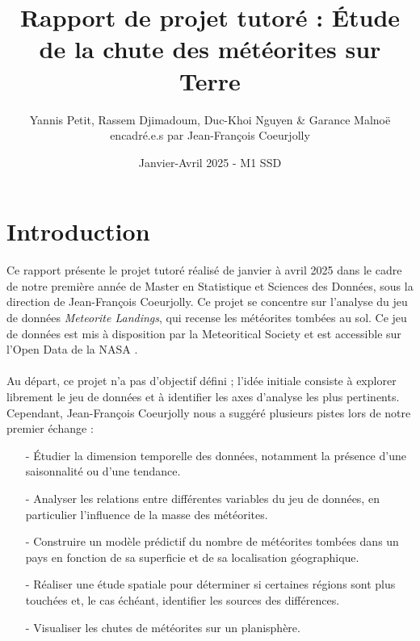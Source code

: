 \documentclass[12pt]{article}
\begin{document}
\title{Rapport de projet tutoré : Étude de la chute des météorites sur Terre}
\author{Yannis Petit, Rassem Djimadoum, Duc-Khoi Nguyen \& Garance Malnoë \\ encadré.e.s par Jean-François Coeurjolly}
\date{Janvier-Avril 2025 - M1 SSD}

\maketitle
\tableofcontents
\clearpage
{}
\section{Introduction}
Ce rapport présente le projet tutoré réalisé de janvier à avril 2025 dans le cadre de notre première année de Master en Statistique et Sciences des Données, sous la direction de Jean-François Coeurjolly. Ce projet se concentre sur l'analyse du jeu de données \textit{Meteorite Landings}, qui recense les météorites tombées au sol. Ce jeu de données est mis à disposition par la Meteoritical Society et est accessible sur l'Open Data de la NASA \cite{OpenData_NASA}.\\
\\
Au départ, ce projet n'a pas d'objectif défini ; l'idée initiale consiste à explorer librement le jeu de données et à identifier les axes d'analyse les plus pertinents. Cependant, Jean-François Coeurjolly nous a suggéré plusieurs pistes lors de notre premier échange :\\
\begin{itemize}
	\item[-] Étudier la dimension temporelle des données, notamment la présence d'une saisonnalité ou d'une tendance.\\
	\item[-] Analyser les relations entre différentes variables du jeu de données, en particulier l'influence de la masse des météorites.\\
	\item[-] Construire un modèle prédictif du nombre de météorites tombées dans un pays en fonction de sa superficie et de sa localisation géographique.\\
	\item[-] Réaliser une étude spatiale pour déterminer si certaines régions sont plus touchées et, le cas échéant, identifier les sources des différences.\\
	\item[-] Visualiser les chutes de météorites sur un planisphère.\\
\end{itemize}
\end{document}
